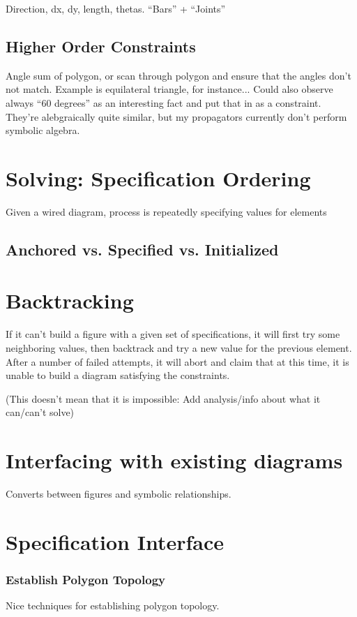 Direction, dx, dy, length, thetas. ``Bars'' + ``Joints''

\subsection{Higher Order Constraints}

Angle sum of polygon, or scan through polygon and ensure that the
angles don't not match. Example is equilateral triangle, for
instance... Could also observe always ``60 degrees'' as an interesting
fact and put that in as a constraint. They're alebgraically quite
similar, but my propagators currently don't perform symbolic algebra.

\section{Solving: Specification Ordering}

Given a wired diagram, process is repeatedly specifying values for elements

\subsection{Anchored vs. Specified vs. Initialized}

\section{Backtracking}

If it can't build a figure with a given set of specifications, it will
first try some neighboring values, then backtrack and try a new value
for the previous element. After a number of failed attempts, it will
abort and claim that at this time, it is unable to build a diagram
satisfying the constraints.

(This doesn't mean that it is impossible: Add analysis/info about what
it can/can't solve)

\section{Interfacing with existing diagrams}

Converts between figures and symbolic relationships.

\section{Specification Interface}

\subsubsection{Establish Polygon Topology}

Nice techniques for establishing polygon topology.
